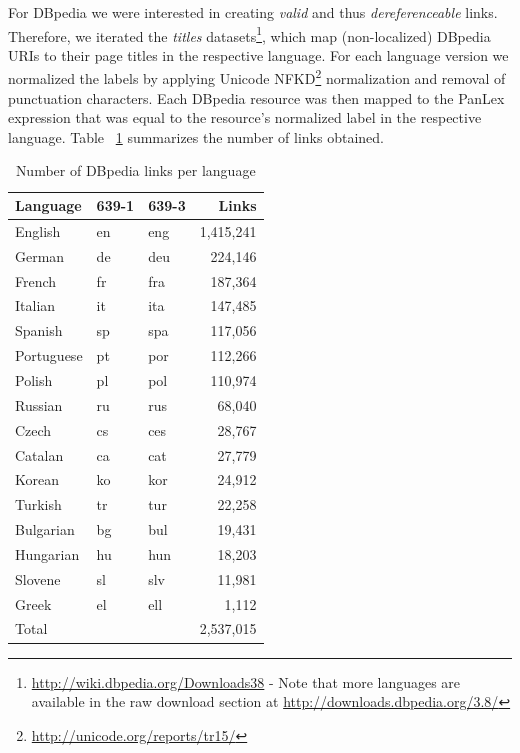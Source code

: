 \documentclass[sw]{iosart2c}
\begin{document}
For DBpedia we were interested in creating \emph{valid} and
thus \emph{dereferenceable} links.
Therefore, we iterated the \emph{titles} datasets\footnote{\url{http://wiki.dbpedia.org/Downloads38} - Note that more languages are available in the raw download section at \url{http://downloads.dbpedia.org/3.8/}},
which map (non-localized) DBpedia URIs to their page titles in the respective language.
For each language version we normalized the labels by applying
Unicode NFKD\footnote{\url{http://unicode.org/reports/tr15/}} normalization and
removal of punctuation characters.
Each DBpedia resource was then mapped to the PanLex expression that was equal to the resource's normalized label in the respective language.
Table ~\ref{fig:plx-dbp-link-counts} summarizes the number of links obtained.
\begin{table}
\centering
\begin{scriptsize}
\begin{tabular}{lllr}
\toprule
Language & 639-1 & 639-3 & Links \\
\midrule
English    & en & eng & 1,415,241 \\
German     & de & deu &   224,146 \\
French     & fr & fra &   187,364 \\
Italian    & it & ita &   147,485 \\
Spanish    & sp & spa &   117,056 \\
Portuguese & pt & por &   112,266 \\
Polish     & pl & pol &   110,974 \\
Russian    & ru & rus &    68,040 \\
Czech      & cs & ces &    28,767 \\
Catalan    & ca & cat &    27,779 \\
Korean     & ko & kor &    24,912 \\
Turkish    & tr & tur &    22,258 \\
Bulgarian  & bg & bul &    19,431 \\
Hungarian  & hu & hun &    18,203 \\
Slovene    & sl & slv &    11,981 \\
Greek      & el & ell &     1,112 \\
\midrule
Total      &    &     & 2,537,015 \\
\bottomrule
\end{tabular}
\end{scriptsize}
\caption{Number of DBpedia links per language}
\label{fig:plx-dbp-link-counts}
\end{table}
\end{document}
